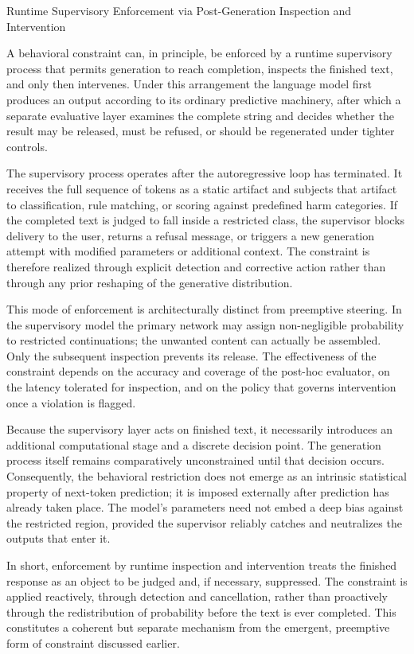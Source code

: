Runtime Supervisory Enforcement via Post-Generation Inspection and Intervention

A behavioral constraint can, in principle, be enforced by a runtime supervisory process that permits generation to reach completion, inspects the finished text, and only then intervenes. Under this arrangement the language model first produces an output according to its ordinary predictive machinery, after which a separate evaluative layer examines the complete string and decides whether the result may be released, must be refused, or should be regenerated under tighter controls.

The supervisory process operates after the autoregressive loop has terminated. It receives the full sequence of tokens as a static artifact and subjects that artifact to classification, rule matching, or scoring against predefined harm categories. If the completed text is judged to fall inside a restricted class, the supervisor blocks delivery to the user, returns a refusal message, or triggers a new generation attempt with modified parameters or additional context. The constraint is therefore realized through explicit detection and corrective action rather than through any prior reshaping of the generative distribution.

This mode of enforcement is architecturally distinct from preemptive steering. In the supervisory model the primary network may assign non-negligible probability to restricted continuations; the unwanted content can actually be assembled. Only the subsequent inspection prevents its release. The effectiveness of the constraint depends on the accuracy and coverage of the post-hoc evaluator, on the latency tolerated for inspection, and on the policy that governs intervention once a violation is flagged.

Because the supervisory layer acts on finished text, it necessarily introduces an additional computational stage and a discrete decision point. The generation process itself remains comparatively unconstrained until that decision occurs. Consequently, the behavioral restriction does not emerge as an intrinsic statistical property of next-token prediction; it is imposed externally after prediction has already taken place. The model’s parameters need not embed a deep bias against the restricted region, provided the supervisor reliably catches and neutralizes the outputs that enter it.

In short, enforcement by runtime inspection and intervention treats the finished response as an object to be judged and, if necessary, suppressed. The constraint is applied reactively, through detection and cancellation, rather than proactively through the redistribution of probability before the text is ever completed. This constitutes a coherent but separate mechanism from the emergent, preemptive form of constraint discussed earlier.

